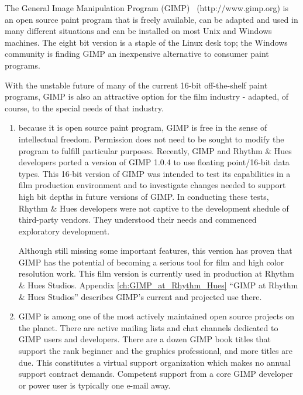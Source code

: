 The General Image Manipulation Program (GIMP) ~(http://www.gimp.org) is an
open source paint program that is freely available, can be adapted and used in
many different situations and can be installed on most Unix and Windows
machines. The eight bit version is a staple of the Linux desk top; the Windows
community is finding GIMP an inexpensive alternative to consumer paint programs.

With the unstable future of many of the current 16-bit off-the-shelf paint
programs, GIMP is also an attractive option for the film industry - adapted,
of course, to the special needs of that industry. 

\begin{enumerate}

\item because it is open source paint program, GIMP is free in the sense of
intellectual freedom. Permission does not need to be sought to modify
the program to fulfill particular purposes. Recently, GIMP and Rhythm
\& Hues developers ported a version of GIMP 1.0.4 to use floating
point/16-bit data types. This 16-bit version of GIMP was intended to
test its capabilities in a film production environment and to
investigate changes needed to support high bit depths in future
versions of GIMP. In conducting these tests, Rhythm \& Hues developers
were not captive to the development shedule of third-party
vendors. They understood their needs and commenced exploratory
development.

Although still missing some important features, this version has
proven that GIMP has the potential of becoming a serious tool for film
and high color resolution work.  This film version is currently used
in production at Rhythm \& Hues Studios. Appendix \ref{ch:GIMP_at_Rhythm_Hues} 
``GIMP at Rhythm \& Hues Studios'' describes GIMP's
current and projected use there.

\item GIMP is among one of the most actively maintained open source projects
on the planet. There are active mailing lists and chat channels
dedicated to GIMP users and developers. There are a dozen GIMP book
titles that support the rank beginner and the graphics professional,
and more titles are due. This constitutes a virtual support
organization which makes no annual support contract demands. Competent
support from a core GIMP developer or power user is typically one
e-mail away.

\end{enumerate}

